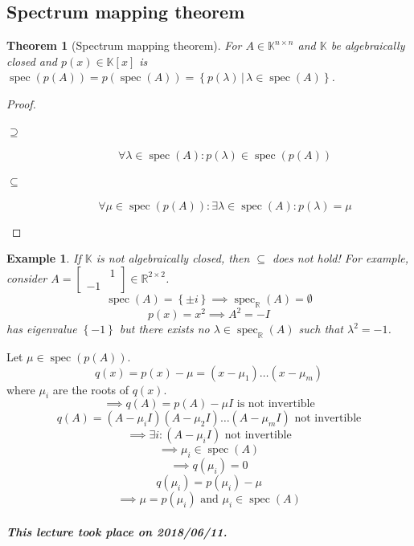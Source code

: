\documentclass{article}
\newtheorem{theorem}{Theorem}  \numberwithin{theorem}{section}
\newtheorem{example}{Example}  \numberwithin{example}{section}
\newcommand{\set}[1]{\left\{#1\right\}}
\newcommand{\setdef}[2]{\left\{\left.#1\,\right|\,#2\right\}}
\newcommand{\dateref}[1]{\paragraph{\textit{This lecture took place on #1.}}}
\begin{document}
\subsection{Spectrum mapping theorem}

\begin{theorem}[Spectrum mapping theorem] %
  For $A \in \mathbb K^{n\times n}$ and $\mathbb K$ be algebraically closed and $p(x) \in \mathbb K[x]$
  is $\operatorname{spec}(p(A)) = p(\operatorname{spec}(A)) = \setdef{p(\lambda)}{\lambda \in \operatorname{spec}(A)}$.
\end{theorem}

\begin{proof}
  \begin{description}
    \item[$\mathbf{\supseteq}$]
      \[ \forall \lambda \in \operatorname{spec}(A): p(\lambda) \in \operatorname{spec}(p(A)) \]
    \item[$\mathbf{\subseteq}$]
      \[ \forall \mu \in \operatorname{spec}(p(A)): \exists \lambda \in \operatorname{spec}(A): p(\lambda) = \mu \]
  \end{description}
\end{proof}

\begin{example} %
  If $\mathbb K$ is not algebraically closed, then $\subseteq$ does not hold!
  For example, consider $A = \begin{bmatrix} & 1 \\ -1 & \end{bmatrix} \in \mathbb R^{2 \times 2}$.
  \[ \operatorname{spec}(A) = \set{\pm i} \implies \operatorname{spec}_{\mathbb R}(A) = \emptyset \]
  \[ p(x) = x^2 \implies A^2 = -I \]
  has eigenvalue $\set{-1}$ but there exists no $\lambda \in \operatorname{spec}_{\mathbb R}(A)$ such that $\lambda^2 = -1$.
\end{example}

Let $\mu \in \operatorname{spec}(p(A))$.
\[ q(x) = p(x) - \mu = (x - \mu_1) \dots (x - \mu_m) \]
where $\mu_i$ are the roots of $q(x)$.
\[ \implies q(A) = p(A) - \mu I \text{ is not invertible} \]
\[ q(A) = (A - \mu_i I)(A - \mu_2 I) \dots (A - \mu_m I) \text{ not invertible} \]
\[ \implies \exists i: (A - \mu_i I) \text{ not invertible} \]
\[ \implies \mu_i \in \operatorname{spec}(A) \]
\[ \implies q(\mu_i) = 0 \]
\[ q(\mu_i) = p(\mu_i) - \mu \]
\[ \implies \mu = p(\mu_i) \text{ and } \mu_i \in \operatorname{spec}(A) \]

\dateref{2018/06/11}
\end{document}
